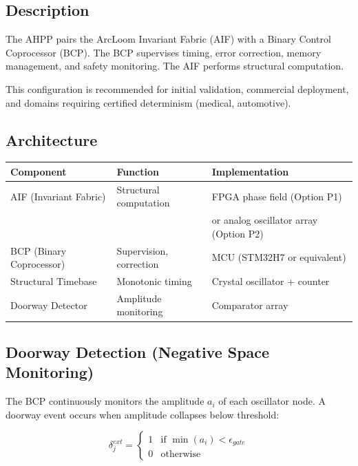 \documentclass[11pt, a4paper]{article}
\begin{document}
\subsection{Description}

The AHPP pairs the ArcLoom Invariant Fabric (AIF) with a Binary Control
Coprocessor (BCP). The BCP supervises timing, error correction, memory
management, and safety monitoring. The AIF performs structural computation.

This configuration is recommended for initial validation, commercial
deployment, and domains requiring certified determinism (medical, automotive).

\subsection{Architecture}

\begin{center}
\begin{tabular}{@{}lll@{}}
\toprule
\textbf{Component} & \textbf{Function} & \textbf{Implementation} \\
\midrule
AIF (Invariant Fabric) & Structural computation & FPGA phase field (Option P1) \\
                       &                        & or analog oscillator array (Option P2) \\
BCP (Binary Coprocessor) & Supervision, correction & MCU (STM32H7 or equivalent) \\
Structural Timebase & Monotonic timing & Crystal oscillator + counter \\
Doorway Detector & Amplitude monitoring & Comparator array \\
\bottomrule
\end{tabular}
\end{center}

\subsection{Doorway Detection (Negative Space Monitoring)}

The BCP continuously monitors the amplitude $a_i$ of each oscillator node.
A doorway event occurs when amplitude collapses below threshold:

\begin{equation}
  \delta_j^{ext} = \begin{cases}
    1 & \text{if } \min(a_i) < \epsilon_{gate} \\
    0 & \text{otherwise}
  \end{cases}
\end{equation}
\end{document}
